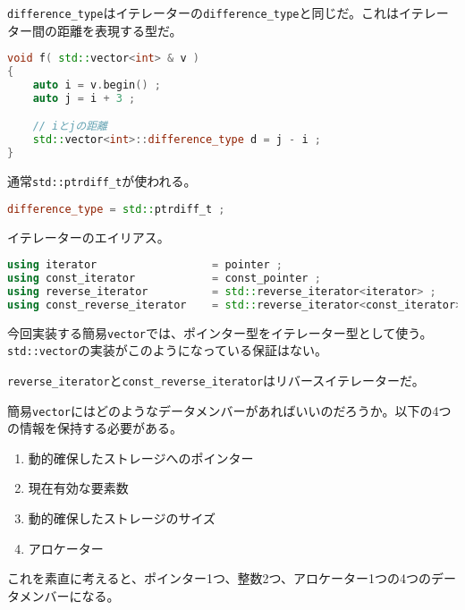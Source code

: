 \texttt{difference\_type}はイテレーターの\texttt{difference\_type}と同じだ。これはイテレーター間の距離を表現する型だ。

\begin{lstlisting}[language={C++}]
void f( std::vector<int> & v )
{
    auto i = v.begin() ;
    auto j = i + 3 ;

    // iとjの距離
    std::vector<int>::difference_type d = j - i ;
}
\end{lstlisting}

通常\texttt{std::ptrdiff\_t}が使われる。

\begin{lstlisting}[language={C++}]
difference_type = std::ptrdiff_t ;
\end{lstlisting}

イテレーターのエイリアス。

\begin{lstlisting}[language={C++}]
using iterator                  = pointer ;
using const_iterator            = const_pointer ;
using reverse_iterator          = std::reverse_iterator<iterator> ;
using const_reverse_iterator    = std::reverse_iterator<const_iterator> ;
\end{lstlisting}

今回実装する簡易\texttt{vector}では、ポインター型をイテレーター型として使う。\texttt{std::vector}の実装がこのようになっている保証はない。

\texttt{reverse\_iterator}と\texttt{const\_reverse\_iterator}はリバースイテレーターだ。


簡易\texttt{vector}にはどのようなデータメンバーがあればいいのだろうか。以下の4つの情報を保持する必要がある。

\begin{enumerate}
\def\labelenumi{\arabic{enumi}.}
\item
  動的確保したストレージへのポインター
\item
  現在有効な要素数
\item
  動的確保したストレージのサイズ
\item
  アロケーター
\end{enumerate}

これを素直に考えると、ポインター1つ、整数2つ、アロケーター1つの4つのデータメンバーになる。

